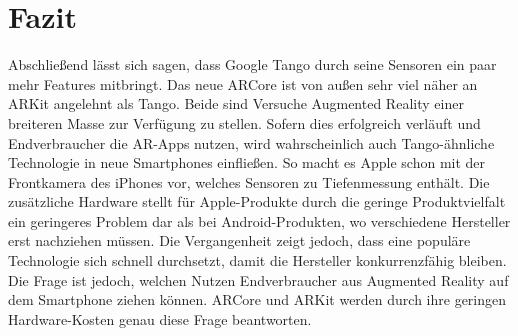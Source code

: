 
\section{Fazit}
Abschließend lässt sich sagen, dass Google Tango durch seine Sensoren ein paar mehr Features mitbringt. Das neue ARCore ist von außen sehr viel näher an ARKit angelehnt als Tango. Beide sind Versuche Augmented Reality einer breiteren Masse zur Verfügung zu stellen. Sofern dies erfolgreich verläuft und Endverbraucher die AR-Apps nutzen, wird wahrscheinlich auch Tango-ähnliche Technologie in neue Smartphones einfließen. So macht es Apple schon mit der Frontkamera des iPhones vor, welches Sensoren zu Tiefenmessung enthält. Die zusätzliche Hardware stellt für Apple-Produkte durch die geringe Produktvielfalt ein geringeres Problem dar als bei Android-Produkten, wo verschiedene Hersteller erst nachziehen müssen. Die Vergangenheit zeigt jedoch, dass eine populäre Technologie sich schnell durchsetzt, damit die Hersteller konkurrenzfähig bleiben. Die Frage ist jedoch, welchen Nutzen Endverbraucher aus Augmented Reality auf dem Smartphone ziehen können. ARCore und ARKit werden durch ihre geringen Hardware-Kosten genau diese Frage beantworten.